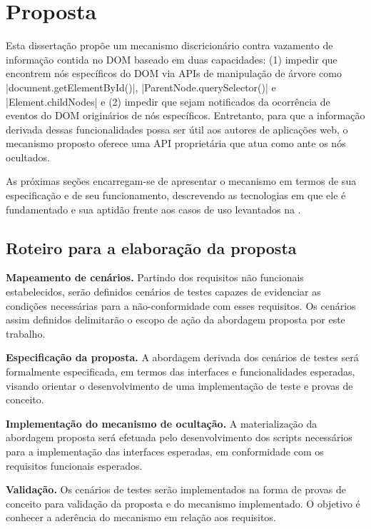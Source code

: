 \chapter{Proposta}

Esta dissertação propõe um mecanismo discricionário contra vazamento de informação contida no DOM baseado em duas capacidades: (1) impedir que {\scripts} encontrem nós específicos do DOM via APIs de manipulação de árvore como |document.getElementById()|, |ParentNode.querySelector()| e |Element.childNodes| e (2) impedir que {\scripts} sejam notificados da ocorrência de eventos do DOM originários de nós específicos. Entretanto, para que a informação derivada dessas funcionalidades possa ser útil aos autores de aplicações web, o mecanismo proposto oferece uma API proprietária que atua como  ante os nós ocultados.%

As próximas seções encarregam-se de apresentar o mecanismo em termos de sua especificação e de seu funcionamento, descrevendo as tecnologias em que ele é fundamentado e sua aptidão frente aos casos de uso levantados na .





\section{Roteiro para a elaboração da proposta}

\begin{alineas}
	\item \textbf{Mapeamento de cenários.} Partindo dos requisitos não funcionais estabelecidos, serão definidos cenários de testes capazes de evidenciar as condições necessárias para a não-conformidade com esses requisitos. Os cenários assim definidos delimitarão o escopo de ação da abordagem proposta por este trabalho.
	\item \textbf{Especificação da proposta.} A abordagem derivada dos cenários de testes será formalmente especificada, em termos das interfaces e funcionalidades esperadas, visando orientar o desenvolvimento de uma implementação de teste e provas de conceito.
	\item \textbf{Implementação do mecanismo de ocultação.} A materialização da abordagem proposta será efetuada pelo desenvolvimento dos scripts necessários para a implementação das interfaces esperadas, em conformidade com os requisitos funcionais esperados.
	\item \textbf{Validação.} Os cenários de testes serão implementados na forma de provas de conceito para validação da proposta e do mecanismo implementado. O objetivo é conhecer a aderência do mecanismo em relação aos requisitos.
\end{alineas}